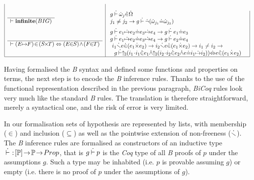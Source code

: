 \documentclass{llncs}
\begin{document}
\begin{table}
\[\begin{array}{|l|l|}
\\

\begin{array}{c}
\\\hline
\vdash \Bcmd{infinite}(BIG)
\end{array}
&
\begin{array}{ll}
\!g\Binf\ebie{j}\pins\ebig\\
\!j_1\neq j_2\to g\Binf\pnot(\ebie{j_1}\pequ\ebie{j_2})\\
\end{array}

\\

\begin{array}{c}
\\\hline
\vdash (E\!\!\mapsto\!\!F)\!\in\!(S\!\!\times\!\!T) \Leftrightarrow 
(E\!\!\in\!\!S)\!\land\!(F\!\!\in\!\!T)
\end{array}
&
\begin{array}{l}
\rule{0cm}{15pt}
\!g\Binf e_1\ecpl e_2\pequ e_3\ecpl e_4 \to g\Binf e_1\pequ e_3\\
\!g\Binf e_1\ecpl e_2\pequ e_3\ecpl e_4 \to g\Binf e_2\pequ e_4\\
\!\begin{array}{l}
\!i_1 \Bnotfree e\pins(e_1\epro e_2) \to i_2 \Bnotfree e\pins(e_1\epro e_2) \to
 i_1 \neq i_2 \to\\
  \: g\Binf\!\!\Bbdexs{i_1}{i_1\pins e_1\pand
    \!\Bbdexs{i_2}{i_2\pins e_2\pand e\pequ i_1\ecpl i_2}}\piff e\pins(e_1\epro e_2)
\end{array}
\end{array}

\\\hline
\end{array}
\]
\end{table}

Having formalised the \emph{B} syntax and defined some functions and properties on terms, the 
next step is to encode the \emph{B} inference rules. Thanks to the use of the functional 
representation described in the previous paragraph, \emph{BiCoq} rules look very much like the 
standard \emph{B} rules. The translation is therefore straightforward, merely a syntactical 
one, and the risk of error is very limited.

In our formalisation sets of hypothesis are represented by lists, with membership ($\in$) and 
inclusion ($\subseteq$) as well as the pointwise extension of non-freeness ($\dot{\smallsetminus}$).
The \emph{B} inference rules are formalised as constructors of an inductive type
$\:\dot{\vdash}\:\!:\![\mathbb{P}]\!\to\!\mathbb{P}\!\to\!Prop$, that is $g \:\dot{\vdash}\: p$ is the \emph{Coq} type of all 
\emph{B} proofs of $p$ under the assumptions $g$. Such a type may be inhabited (i.e. $p$ is 
provable assuming $g$) or empty (i.e. there is no proof of $p$ under the assumptions of $g$).
\end{document}
